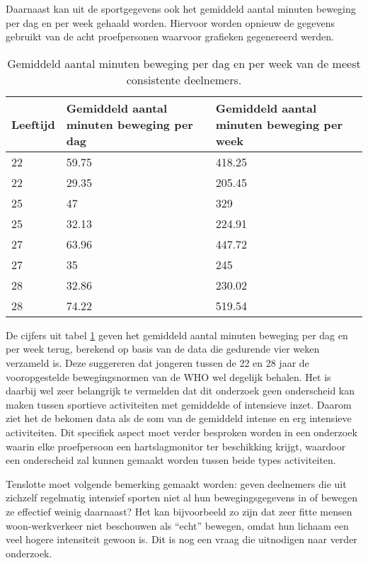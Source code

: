 Daarnaast kan uit de sportgegevens ook het gemiddeld aantal minuten beweging per dag en per week gehaald worden. Hiervoor worden opnieuw de gegevens gebruikt van de acht proefpersonen waarvoor grafieken gegenereerd werden.

\begin{table}[h]
    \caption[Gemiddeld aantal minuten beweging per dag en per week]{Gemiddeld aantal minuten beweging per dag en per week van de meest consistente deelnemers.}
    \centering
    \label{table:gemiddeldes}
\begin{tabular}{||m{.2\linewidth} m{.4\linewidth} m{.4\linewidth}||}
    \hline
    Leeftijd & Gemiddeld aantal minuten beweging per dag & Gemiddeld aantal minuten beweging per week \\ [0.5ex]
    \hline\hline
    22 & 59.75 & 418.25 \\
    22 & 29.35 & 205.45 \\
    25 & 47 & 329 \\
    25 & 32.13 & 224.91 \\
    27 & 63.96 & 447.72 \\
    27 & 35 & 245 \\
    28 & 32.86 & 230.02 \\
    28 & 74.22 & 519.54 \\ [1ex]
    \hline
\end{tabular}
\end{table}

De cijfers uit tabel \ref{table:gemiddeldes} geven het gemiddeld aantal minuten beweging per dag en per week terug, berekend op basis van de data die gedurende vier weken verzameld is.
Deze suggereren dat jongeren tussen de 22 en 28 jaar de vooropgestelde bewegingsnormen van de WHO wel degelijk behalen.
Het is daarbij wel zeer belangrijk te vermelden dat dit onderzoek geen onderscheid kan maken tussen sportieve activiteiten met gemiddelde of intensieve inzet. Daarom ziet het de bekomen data als de som van de gemiddeld intense en erg intensieve activiteiten. Dit specifiek aspect moet verder besproken worden in een onderzoek waarin elke proefpersoon een hartslagmonitor ter beschikking krijgt, waardoor een onderscheid zal kunnen gemaakt worden tussen beide types activiteiten.

Tenslotte moet volgende bemerking gemaakt worden: geven deelnemers die uit zichzelf regelmatig intensief sporten niet al hun bewegingsgegevens in of bewegen ze effectief weinig daarnaast? Het kan bijvoorbeeld zo zijn dat zeer fitte mensen woon-werkverkeer niet beschouwen als ``echt'' bewegen, omdat hun lichaam een veel hogere intensiteit gewoon is. Dit is nog een vraag die uitnodigen naar verder onderzoek.


